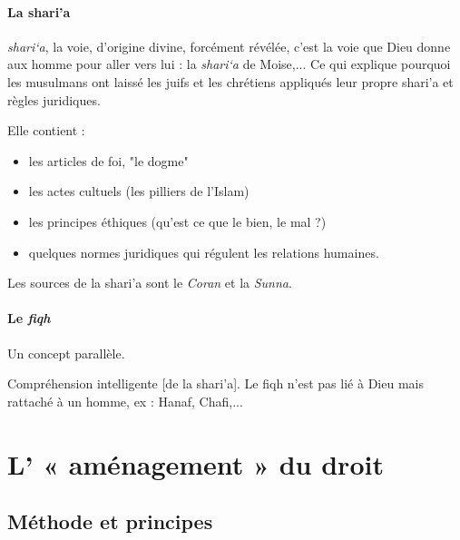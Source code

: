  
  \paragraph{La shari'a}
  
  \begin{Def}
    \emph{shari`a}, la voie, d'origine divine, forcément révélée, c'est la voie que Dieu donne aux homme pour aller vers lui : la \emph{shari`a} de Moise,... Ce qui explique pourquoi les musulmans ont laissé les juifs et les chrétiens appliqués leur propre shari'a et règles juridiques.
  \end{Def}
    
Elle contient : 
\begin{itemize}
    \item les articles de foi, "le dogme"
    \item les actes cultuels (les pilliers de l'Islam)
    \item les principes éthiques (qu'est ce que le bien, le mal ?)
    \item quelques normes juridiques qui régulent les relations humaines. 
\end{itemize}
  
  Les sources de la shari'a sont le \textit{Coran} et la \textit{Sunna}.
  
  
  
  
    \paragraph{Le \emph{fiqh}} Un concept parallèle.
    
    \begin{Def}
    Compréhension intelligente [de la shari'a]. Le fiqh n'est pas lié à Dieu mais rattaché à un homme, ex : Hanaf, Chafi,...
    \end{Def}
    
    
  
\section{L' « aménagement » du
  droit}  
  
  
  
  
    
    \subsection{Méthode et principes}
    
  
